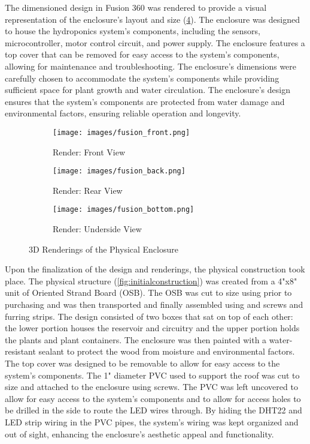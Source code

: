 \documentclass[12pt]{article} %
\begin{document}
\pagebreak
\noindent The dimensioned design in Fusion 360 was rendered to provide a visual representation of the enclosure's layout and size (\ref{fig:renderings}). The enclosure was designed to house the hydroponics system's components, including the sensors, microcontroller, motor control circuit, and power supply. The enclosure features a top cover that can be removed for easy access to the system's components, allowing for maintenance and troubleshooting. The enclosure's dimensions were carefully chosen to accommodate the system's components while providing sufficient space for plant growth and water circulation. The enclosure's design ensures that the system's components are protected from water damage and environmental factors, ensuring reliable operation and longevity.
\begin{figure}[H]
    \centering
    \begin{subfigure}[b]{0.3\textwidth}
        \centering
        \texttt{[image: images/fusion\_front.png]}
        \caption{Render: Front View}
        \label{fig:fusionfront}
    \end{subfigure}
    \hfill
    \begin{subfigure}[b]{0.3\textwidth}
        \centering
        \texttt{[image: images/fusion\_back.png]}
        \caption{Render: Rear View}
        \label{fig:fusionrear}
    \end{subfigure}
    \hfill
    \begin{subfigure}[b]{0.3\textwidth}
        \centering
        \texttt{[image: images/fusion\_bottom.png]}
        \caption{Render: Underside View}
        \label{fig:fusionbottom}
    \end{subfigure}
    \caption{3D Renderings of the Physical Enclosure}
    \label{fig:renderings}
\end{figure}


\noindent Upon the finalization of the design and renderings, the physical construction took place. The physical structure (\ref{fig:initialconstruction}) was created from a 4"x8" unit of Oriented Strand Board (OSB). The OSB was cut to size using prior to purchasing and was then transported and finally assembled using and screws and furring strips. The design consisted of two boxes that sat on top of each other: the lower portion houses the reservoir and circuitry and the upper portion holds the plants and plant containers. The enclosure was then painted with a water-resistant sealant to protect the wood from moisture and environmental factors. The top cover was designed to be removable to allow for easy access to the system's components. The 1" diameter PVC used to support the roof was cut to size and attached to the enclosure using screws. The PVC was left uncovered to allow for easy access to the system's components and to allow for access holes to be drilled in the side to route the LED wires through. By hiding the DHT22 and LED strip wiring in the PVC pipes, the system's wiring was kept organized and out of sight, enhancing the enclosure's aesthetic appeal and functionality.
\end{document}
